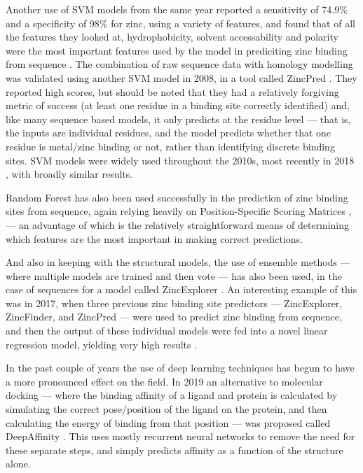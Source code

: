 Another use of SVM models from the same year reported a sensitivity of 74.9\% and a specificity of 98\% for zinc, using a variety of features, and found that of all the features they looked at, hydrophobicity, solvent accessability and polarity were the most important features used by the model in prediciting zinc binding from sequence \cite{lin2006prediction}. The combination of raw sequence data with homology modelling was validated using another SVM model in 2008, in a tool called ZincPred \cite{shu2008prediction}. They reported high scores, but should be noted that they had a relatively forgiving metric of success (at least one residue in a binding site correctly identified) and, like many sequence based models, it only predicts at the residue level --- that is, the inputs are individual residues, and the model predicts whether that one residue is metal/zinc binding or not, rather than identifying discrete binding sites. SVM models were widely used throughout the 2010s, most recently in 2018 \cite{srivastava2018prediction}, with broadly similar results.

Random Forest has also been used successfully in the prediction of zinc binding sites from sequence, again relying heavily on Position-Specific Scoring Matrices \cite{zheng2012}, \cite{Kumar2017} --- an advantage of which is the relatively straightforward means of determining which features are the most important in making correct predictions.

And also in keeping with the structural models, the use of ensemble methods --- where multiple models are trained and then vote --- has also been used, in the case of sequences for a model called ZincExplorer \cite{chen2013}. An interesting example of this was in 2017, when three previous zinc binding site predictors --- ZincExplorer, ZincFinder, and ZincPred --- were used to predict zinc binding from sequence, and then the output of these individual models were fed into a novel linear regression model, yielding very high results \cite{li2017}.

In the past couple of years the use of deep learning techniques has begun to have a more pronounced effect on the field. In 2019 an alternative to molecular docking --- where the binding affinity of a ligand and protein is calculated by simulating the correct pose/position of the ligand on the protein, and then calculating the energy of binding from that position --- was proposed called DeepAffinity \cite{karimi2019}. This uses mostly recurrent neural networks to remove the need for these separate steps, and simply predicts affinity as a function of the structure alone.

